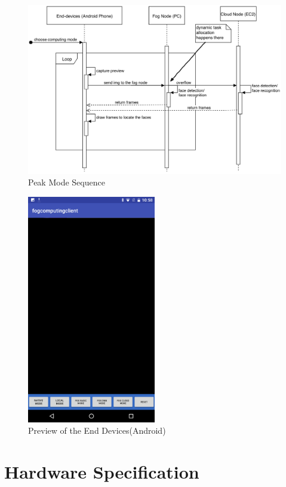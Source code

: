 \begin{figure}
    \centering
    \includegraphics[width=\textwidth]{images/cloud_mode.png}
    \caption{Peak Mode Sequence}
    \label{fig:peak_mode_sequence}
\end{figure}


\begin{figure}
    \centering
    \includegraphics[width=0.5\textwidth]{images/preview.png}
    \caption{Preview of the End Devices(Android)}
    \label{fig:preview}
\end{figure}

\section{Hardware Specification}

